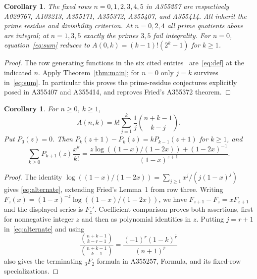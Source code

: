 \documentclass[11pt]{article}
\newtheorem{corollary}[theorem]{Corollary}
\begin{document}
\begin{corollary}\label{cor:rows}
The fixed rows $n=0,1,2,3,4,5$ in A355257 are respectively
A029767, A103213, A355171, A355372, A355407, and A355414.
All inherit the prime residue and divisibility criterion.
At $n=0,2,4$ all prime quotients above are integral;
at $n=1,3,5$ exactly the primes $3,5$ fail integrality.
For $n=0$, equation~\eqref{eq:sum} reduces to
$A(0,k)=(k-1)!(2^k-1)$ for $k\geq1$.
\end{corollary}
\begin{proof}
The row generating functions in the six cited entries~\cite{rows}
are~\eqref{eq:def} at the indicated $n$. Apply
Theorem~\ref{thm:main}; for $n=0$ only $j=k$ survives
in~\eqref{eq:sum}. In particular this proves the prime-residue
conjectures explicitly posed in A355407 and A355414,
and reproves Fried's A355372 theorem.
\end{proof}

\begin{corollary}\label{cor:identities}
For $n\geq0$, $k\geq1$,
\begin{equation}\label{eq:alternate}
 A(n,k)=k!\sum_{j=1}^k\frac1j\binom{n+k-1}{k-j}.
\end{equation}
Put $P_0(z)=0$. Then $P_k(z+1)-P_k(z)=kP_{k-1}(z+1)$ for
$k\geq1$, and
\[
 \sum_{k\geq0}P_{k+1}(z)\frac{x^k}{k!}
 =\frac{z\log((1-x)/(1-2x))+(1-2x)^{-1}}{(1-x)^{z+1}}.
\]
\end{corollary}
\begin{proof}
The identity
$\log((1-x)/(1-2x))=\sum_{j\geq1}x^j/(j(1-x)^j)$ gives
\eqref{eq:alternate}, extending Fried's Lemma~1 from row three.
Writing $F_z(x)=(1-x)^{-z}\log((1-x)/(1-2x))$, we have
$F_{z+1}-F_z=xF_{z+1}$ and the displayed series is $F_z'$.
Coefficient comparison proves both assertions, first for nonnegative
integer $z$ and then as polynomial identities in $z$.
Putting $j=r+1$ in~\eqref{eq:alternate} and using
\[
 \frac{\binom{n+k-1}{k-r-1}}{\binom{n+k-1}{k-1}}
 =\frac{(-1)^r(1-k)^{\overline r}}{(n+1)^{\overline r}}
\]
also gives the terminating ${}_3F_2$ formula in A355257, Formula,
and its fixed-row specializations.
\end{proof}
\end{document}
